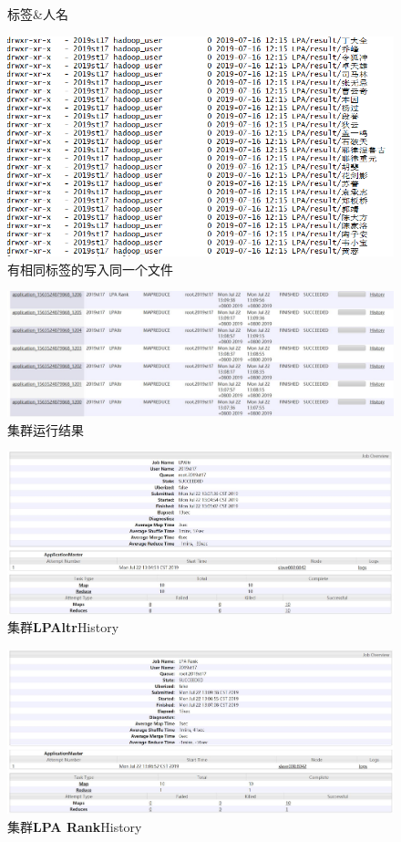 \documentclass{ctexart}
\begin{document}
\begin{figure}[H]
\begin{minipage}[t]{0.15\textwidth}
		\caption{标签\&人名}
		\label{flagName}
	\end{minipage}
	\begin{minipage}[t]{0.75\textwidth}
		\centering
		\includegraphics[width=0.9\linewidth]{pic/task5/Result}
		\caption{有相同标签的写入同一个文件}
		\label{nameFile}
	\end{minipage}
	\end{figure}
	\begin{figure}[H]
	\centering
	\includegraphics[width=0.8\linewidth]{pic/webui/task5}
	\caption{集群运行结果}
	\end{figure}
		\begin{figure}[H]
		\centering
		\includegraphics[width=0.8\linewidth]{pic/webui/task5_job1}
		\caption{集群\textbf{LPAltr}History}
	\end{figure}
	\begin{figure}[H]
	\centering
	\includegraphics[width=0.8\linewidth]{pic/webui/task5_job2}
	\caption{集群\textbf{LPA Rank}History}
\end{figure}
\end{document}
